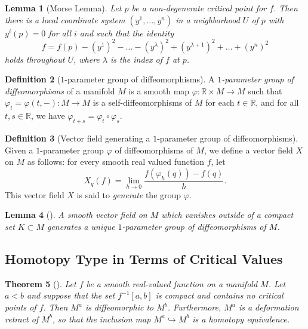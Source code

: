 \documentclass[reqno]{amsart}
\newtheorem{theorem}{Theorem}[section]
\newtheorem{lemma}[theorem]{Lemma}
\theoremstyle{definition}
\newtheorem{definition}[theorem]{Definition}
\theoremstyle{remark}
\begin{document}
    \begin{lemma}[Morse Lemma]
        Let $p$ be a non-degenerate critical point
        for $f$. Then there is a local coordinate
        system $\left( y^{1}, \ldots, y^{n} \right) $ in
        a neighborhood $U$ of $p$ with
        $y^{i}(p) = 0$ for all $i$ and such that the identity
        \[
        f = f(p) - \left( y^{1} \right)^2 - \ldots
        - \left( y^{\lambda} \right)^2 + 
        \left( y^{\lambda+1} \right)^2 + \ldots
        + \left( y^{n} \right)^2
        \] 
        holds throughout $U$, where
        $\lambda$ is the index of $f$ at $p$.
    \end{lemma}

    \begin{definition}[$1$-parameter group of diffeomorphisms]
        A \textit{$1$-parameter group of diffeomorphisms}
        of a manifold $M$ is a smooth map
        $\varphi \colon \mathbb{R} \times M \to M$ such that
        $\varphi_t = \varphi (t,-) \colon M \to M$ is a 
        self-diffeomorphisms of $M$ for each $t \in \mathbb{R}$,
        and for all $t,s \in \mathbb{R}$, we have
        $\varphi_{t+s} = \varphi_t \circ \varphi_s$.
    \end{definition}

    \begin{definition}[Vector field generating a $1$-parameter
        group of diffeomorphisms]
        Given a $1$-parameter group $\varphi $ of diffeomorphisms
        of $M$, we define a vector field $X$ on $M$ as
        follows: for every smooth real valued
        function $f$, let
        \[
        X_q (f) = 
        \lim_{h \to 0} \frac{f\left( \varphi_h(q) \right) -
        f(q)}{h}.
        \] 
        This vector field $X$ is said to \textit{generate} the
        group $\varphi $.
    \end{definition}

    \begin{lemma}[]
        A smooth vector field on $M$ which vanishes
        outside of a compact set $K \subset M$ 
        generates a unique $1$-parameter group of diffeomorphisms
        of $M$.
    \end{lemma}

    \subsection{Homotopy Type in Terms of Critical Values}

    \begin{theorem}[]
        Let $f$ be a smooth real-valued function on a manifold
        $M$. Let $a < b$ and suppose that the set
        $f^{-1}\left[ a,b \right] $ is compact and contains
        no critical points of $f$. Then $M^{a}$ is diffeomorphic
        to $M^{b}$. Furthermore, $M^{a}$ is a deformation
        retract of $M^{b}$, so that the inclusion map
        $M^{a} \hookrightarrow M^{b}$ is a homotopy equivalence.
    \end{theorem}
\end{document}
